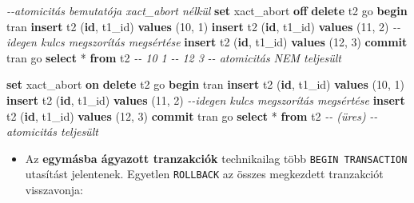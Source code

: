 \documentclass[
  magyar,
]{article}
\newenvironment{Shaded}{}{}
\newcommand{\CommentTok}[1]{\textcolor[rgb]{0.38,0.63,0.69}{\textit{#1}}}
\newcommand{\ControlFlowTok}[1]{\textcolor[rgb]{0.00,0.44,0.13}{\textbf{#1}}}
\newcommand{\DecValTok}[1]{\textcolor[rgb]{0.25,0.63,0.44}{#1}}
\newcommand{\KeywordTok}[1]{\textcolor[rgb]{0.00,0.44,0.13}{\textbf{#1}}}
\newcommand{\NormalTok}[1]{#1}
\newcommand{\OperatorTok}[1]{\textcolor[rgb]{0.40,0.40,0.40}{#1}}
\providecommand{\tightlist}{%
  \setlength{\itemsep}{0pt}\setlength{\parskip}{0pt}}
\begin{document}
\begin{Shaded}
\begin{Highlighting}[]
\CommentTok{{-}{-}atomicitás bemutatója xact\_abort nélkül}
\KeywordTok{set}\NormalTok{ xact\_abort }\KeywordTok{off}
\KeywordTok{delete}\NormalTok{ t2}
\NormalTok{go}
\ControlFlowTok{begin}\NormalTok{ tran}
    \KeywordTok{insert}\NormalTok{ t2 (}\KeywordTok{id}\NormalTok{, t1\_id) }\KeywordTok{values}\NormalTok{ (}\DecValTok{10}\NormalTok{, }\DecValTok{1}\NormalTok{)}
    \KeywordTok{insert}\NormalTok{ t2 (}\KeywordTok{id}\NormalTok{, t1\_id) }\KeywordTok{values}\NormalTok{ (}\DecValTok{11}\NormalTok{, }\DecValTok{2}\NormalTok{) }\CommentTok{{-}{-}idegen kulcs megszorítás megsértése}
    \KeywordTok{insert}\NormalTok{ t2 (}\KeywordTok{id}\NormalTok{, t1\_id) }\KeywordTok{values}\NormalTok{ (}\DecValTok{12}\NormalTok{, }\DecValTok{3}\NormalTok{)}
\KeywordTok{commit}\NormalTok{ tran}
\NormalTok{go}
\KeywordTok{select} \OperatorTok{*} \KeywordTok{from}\NormalTok{ t2}
\CommentTok{{-}{-} 10   1}
\CommentTok{{-}{-} 12   3}
\CommentTok{{-}{-} atomicitás NEM teljesült}

\KeywordTok{set}\NormalTok{ xact\_abort }\KeywordTok{on}
\KeywordTok{delete}\NormalTok{ t2}
\NormalTok{go}
\ControlFlowTok{begin}\NormalTok{ tran}
    \KeywordTok{insert}\NormalTok{ t2 (}\KeywordTok{id}\NormalTok{, t1\_id) }\KeywordTok{values}\NormalTok{ (}\DecValTok{10}\NormalTok{, }\DecValTok{1}\NormalTok{)}
    \KeywordTok{insert}\NormalTok{ t2 (}\KeywordTok{id}\NormalTok{, t1\_id) }\KeywordTok{values}\NormalTok{ (}\DecValTok{11}\NormalTok{, }\DecValTok{2}\NormalTok{) }\CommentTok{{-}{-}idegen kulcs megszorítás megsértése}
    \KeywordTok{insert}\NormalTok{ t2 (}\KeywordTok{id}\NormalTok{, t1\_id) }\KeywordTok{values}\NormalTok{ (}\DecValTok{12}\NormalTok{, }\DecValTok{3}\NormalTok{)}
\KeywordTok{commit}\NormalTok{ tran}
\NormalTok{go}
\KeywordTok{select} \OperatorTok{*} \KeywordTok{from}\NormalTok{ t2}
\CommentTok{{-}{-} (üres)}
\CommentTok{{-}{-} atomicitás teljesült}
\end{Highlighting}
\end{Shaded}

\begin{itemize}
\tightlist
\item
  Az \textbf{egymásba ágyazott tranzakciók} technikailag több
  \texttt{BEGIN\ TRANSACTION} utasítást jelentenek. Egyetlen
  \texttt{ROLLBACK} az összes megkezdett tranzakciót visszavonja:
\end{itemize}
\end{document}
